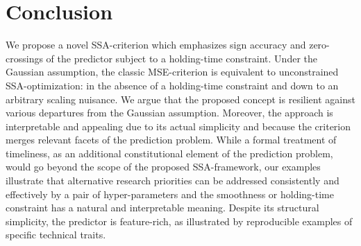\documentclass[a4paper]{article}
\begin{document}
\section{Conclusion}\label{conclusion}

We propose a novel  SSA-criterion which emphasizes sign accuracy and zero-crossings of the predictor subject to a holding-time constraint. Under the Gaussian assumption, the classic MSE-criterion is equivalent to  unconstrained SSA-optimization: in the absence of a holding-time constraint and down to an arbitrary scaling nuisance. We argue that the proposed concept is resilient against various departures from the Gaussian assumption. Moreover, %
the approach is interpretable and appealing %
due to its actual simplicity and because the criterion merges relevant facets of the prediction problem. %
While a formal treatment of timeliness, as an additional constitutional element of the prediction problem, would go beyond the scope of the proposed SSA-framework, our examples illustrate that alternative research priorities can be addressed consistently and effectively by a pair of hyper-parameters and the smoothness or holding-time constraint has a natural and interpretable meaning. Despite its structural simplicity, the predictor is feature-rich, as illustrated by reproducible examples of specific technical traits.  %
\end{document}
